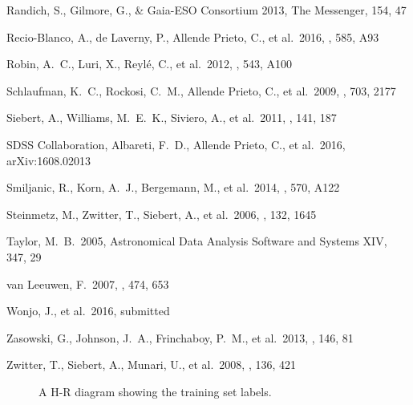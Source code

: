 \documentclass[preprint,trackchanges]{aastex}
\begin{document}
\begin{thebibliography}{dummy}
 Randich, S., Gilmore, G., \& Gaia-ESO Consortium 2013, The Messenger, 154, 47 

 Recio-Blanco, A., de Laverny, P., Allende Prieto, C., et al.\ 2016, \aap, 585, A93 

 Robin, A.~C., Luri, X., Reyl{\'e}, C., et al.\ 2012, \aap, 543, A100 

 Schlaufman, K.~C., Rockosi, C.~M., Allende Prieto, C., et al.\ 2009, \apj, 703, 2177 

 Siebert, A., Williams, M.~E.~K., Siviero, A., et al.\ 2011, \aj, 141, 187 

 SDSS Collaboration, Albareti, F.~D., Allende Prieto, C., et al.\ 2016, arXiv:1608.02013 

 Smiljanic, R., Korn, A.~J., Bergemann, M., et al.\ 2014, \aap, 570, A122 

 Steinmetz, M., Zwitter, T., Siebert, A., et al.\ 2006, \aj, 132, 1645 

 Taylor, M.~B.\ 2005, Astronomical Data Analysis Software and Systems XIV, 347, 29 

 van Leeuwen, F.\ 2007, \aap, 474, 653 

 Wonjo, J., et al.\ 2016, submitted

 Zasowski, G., Johnson, J.~A., Frinchaboy, P.~M., et al.\ 2013, \aj, 146, 81 

 Zwitter, T., Siebert, A., Munari, U., et al.\ 2008, \aj, 136, 421 

\end{thebibliography}

\clearpage

\begin{figure}[p]
\caption{A H-R diagram showing the training set labels.\label{fig:training-set-hrd}}
\end{figure}
\end{document}

